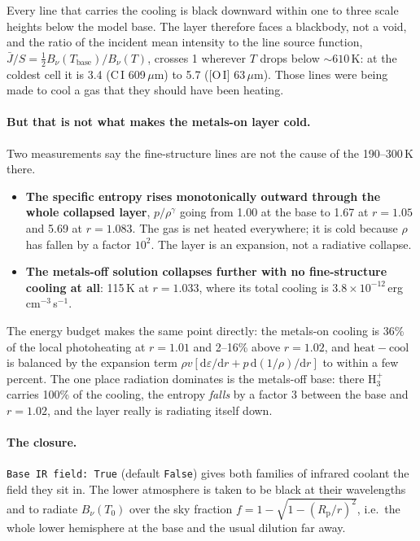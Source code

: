 \documentclass[english,a4paper]{my_memo}
\newcommand{\Rp}{R_{\mathrm{p}}}
\begin{document}
\noindent Every line that carries the cooling is black downward within one to
three scale heights below the model base. The layer therefore faces a blackbody,
not a void, and the ratio of the incident mean intensity to the line source
function, $\bar J/S = \tfrac12 B_\nu(T_\mathrm{base})/B_\nu(T)$, crosses 1
wherever $T$ drops below ${\sim}610$\,K: at the coldest cell it is 3.4 (C\,I
609\,$\mu$m) to 5.7 ([O\,I] 63\,$\mu$m). Those lines were being made to cool a gas
that they should have been heating.

\paragraph{But that is not what makes the metals-on layer cold.} Two measurements
say the fine-structure lines are not the cause of the 190--300\,K there.
\begin{itemize}
\item \textbf{The specific entropy rises monotonically outward through the whole
  collapsed layer}, $p/\rho^{\gamma}$ going from 1.00 at the base to 1.67 at
  $r=1.05$ and 5.69 at $r=1.083$. The gas is net heated everywhere; it is cold
  because $\rho$ has fallen by a factor $10^{2}$. The layer is an expansion, not a
  radiative collapse.
\item \textbf{The metals-off solution collapses further with no fine-structure
  cooling at all}: 115\,K at $r=1.033$, where its total cooling is
  $3.8\times10^{-12}$\,erg\,cm$^{-3}$\,s$^{-1}$.
\end{itemize}
The energy budget makes the same point directly: the metals-on cooling is 36\% of
the local photoheating at $r=1.01$ and 2--16\% above $r=1.02$, and
$\mathrm{heat}-\mathrm{cool}$ is balanced by the expansion term
$\rho v[\mathrm{d}\varepsilon/\mathrm{d}r + p\,\mathrm{d}(1/\rho)/\mathrm{d}r]$ to
within a few percent. The one place radiation dominates is the metals-off base:
there H$_3^+$ carries 100\% of the cooling, the entropy \emph{falls} by a factor 3
between the base and $r=1.02$, and the layer really is radiating itself down.

\paragraph{The closure.} \texttt{Base IR field: True} (default \texttt{False})
gives both families of infrared coolant the field they sit in. The lower
atmosphere is taken to be black at their wavelengths and to radiate $B_\nu(T_0)$
over the sky fraction $f = 1-\sqrt{1-(\Rp/r)^{2}}$, i.e.\ the whole lower
hemisphere at the base and the usual dilution far away.
\end{document}
